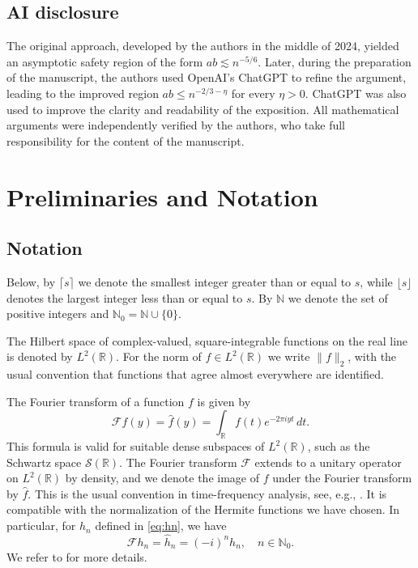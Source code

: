 \documentclass[11pt]{amsart}
\numberwithin{equation}{section}
\newcommand{\R}{{\mathbb R}}
\newcommand{\N}{{\mathbb N}}
\begin{document}
\subsection{AI disclosure}
The original approach, developed by the authors in the middle of 2024, yielded an asymptotic safety region of the form $ab \lesssim n^{-5/6}$. Later, during the preparation of the manuscript, the authors used OpenAI's ChatGPT to refine the argument, leading to the improved region $ab\leq n^{-2/3-\eta}$ for every $\eta>0$. ChatGPT was also used to improve the clarity and readability of the exposition. All mathematical arguments were independently verified by the authors, who take full responsibility for the content of the manuscript.

\section{Preliminaries and Notation}
\subsection{Notation}
Below, by $\lceil s\rceil$ we denote the smallest integer greater than or equal to $s$, while $\lfloor s\rfloor$ denotes the largest integer less than or equal to $s$. By $\N$ we denote the set of positive integers and $\N_0 = \N \cup \{0\}$.

The Hilbert space of complex-valued, square-integrable functions on the real line is denoted by $L^2(\R)$. For the norm of $f \in L^2(\R)$ we write $\|f\|_2$, with the usual convention that functions that agree almost everywhere are identified.

The Fourier transform of a function $f$ is given by
\begin{equation}
    \mathcal{F} f (y) = \widehat{f}(y) = \int_{\R} f(t) e^{-2 \pi i y t} \, dt.
\end{equation}
This formula is valid for suitable dense subspaces of $L^2(\R)$, such as the Schwartz space $\mathcal{S}(\R)$. The Fourier transform $\mathcal{F}$ extends to a unitary operator on $L^2(\R)$ by density, and we denote the image of $f$ under the Fourier transform by $\widehat{f}$. This is the usual convention in time-frequency analysis, see, e.g., \cite{Gro01}. It is compatible with the normalization of the Hermite functions we have chosen. In particular, for $h_n$ defined in \eqref{eq:hn}, we have
\begin{equation}
    \mathcal{F} h_n = \widehat{h}_n = (-i)^n h_n, \quad n \in \N_0.
\end{equation}
We refer to \cite{Fol89} for more details.
\end{document}
